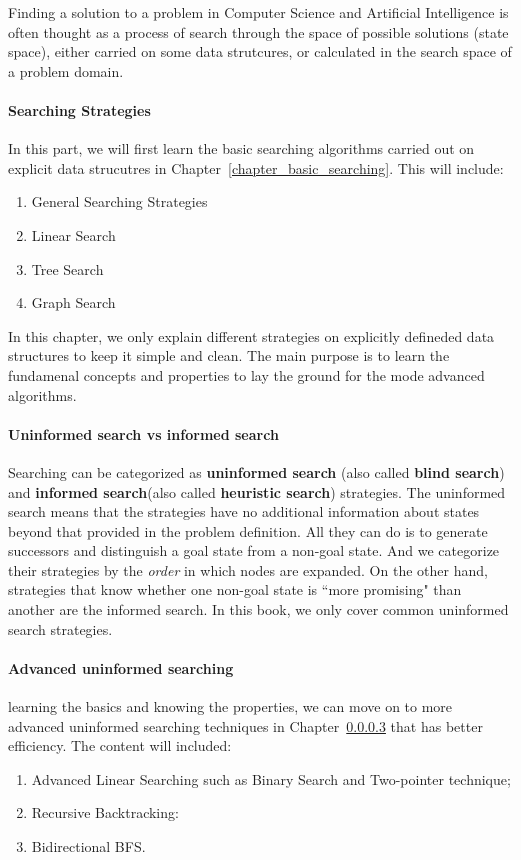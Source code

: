 \documentclass[../main.tex]{subfiles}
\begin{document}
Finding a solution to a problem in
Computer  Science  and  Artificial  Intelligence  is  often  thought 
as a process of search through the space of  possible  solutions (state space), either carried on some data strutcures, or calculated in the search space of a problem domain. 

\paragraph{Searching Strategies} In this part, we will first learn the basic searching algorithms carried out on explicit data strucutres in Chapter~\ref{chapter_basic_searching}. This will include:
\begin{enumerate}
    \item General Searching Strategies
    \item Linear Search
    \item Tree Search
    \item Graph Search
\end{enumerate}
In this chapter, we only explain different strategies on explicitly defineded data structures to keep it simple and clean. The main purpose is to learn the fundamenal concepts and properties to lay the ground for the mode advanced algorithms. 

\paragraph{Uninformed search vs informed search} Searching can be categorized as \textbf{uninformed search} (also called \textbf{blind search}) and \textbf{informed search}(also called \textbf{heuristic search}) strategies. The uninformed search means that the strategies have no additional information about states beyond that provided in the problem definition. All they can do is to generate successors and distinguish a goal state from a non-goal state. And we categorize their strategies by the \textit{order} in which nodes are expanded. On the other hand, strategies that know whether one non-goal state is ``more promising" than another are the informed search. In this book, we only cover common uninformed search strategies. 


\paragraph{Advanced uninformed searching} learning the basics and knowing the properties, we can move on to more advanced uninformed searching techniques in Chapter~\ref{} that has better efficiency. The content will included:
\begin{enumerate}
    \item Advanced Linear Searching such as Binary Search and Two-pointer technique;
    \item Recursive Backtracking:
    \item Bidirectional BFS. 
\end{enumerate}
\end{document}
